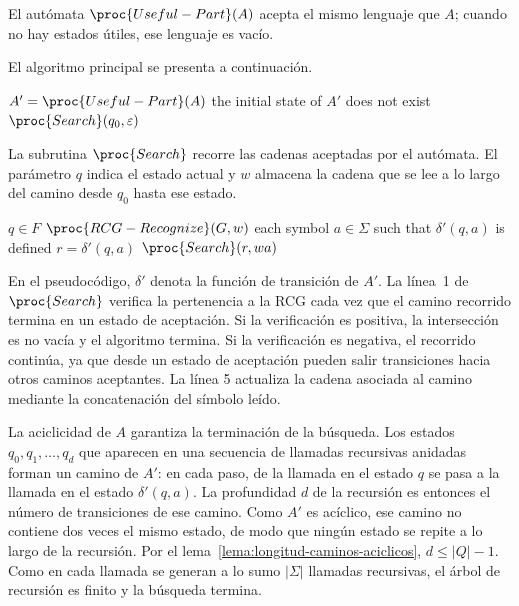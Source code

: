 \documentclass{report}
\theoremstyle{definition}
\theoremstyle{plain}
\theoremstyle{remark}
\begin{document}

El autómata $\proc{Useful-Part}(A)$ acepta el mismo lenguaje que $A$;
cuando no hay estados útiles, ese lenguaje es vacío.

El algoritmo principal se presenta a continuación.

\begin{codebox}
  \li $A' = \proc{Useful-Part}(A)$
  \li \If the initial state of $A'$ does not exist
  \li \Then \Return {}
  \End
  \li \Return $\proc{Search}(q_0,\varepsilon)$
\end{codebox}

La subrutina $\proc{Search}$ recorre las cadenas aceptadas por el
autómata. El parámetro $q$ indica el estado actual y $w$ almacena la
cadena que se lee a lo largo del camino desde $q_0$ hasta ese estado.

\begin{codebox}
  \li \If $q \in F$  $\proc{RCG-Recognize}(G,w)$
  \li \Then \Return {}
  \End
  \li \For each symbol $a \in \Sigma$ such that $\delta'(q,a)$ is defined
  \li \Do
  $r = \delta'(q,a)$
  \li     \If $\proc{Search}(r,wa)$
  \li     \Then \Return {}
  \End
  \End
  \li \Return {}
\end{codebox}

En el pseudocódigo, $\delta'$ denota la función de transición de $A'$.
La línea~1 de $\proc{Search}$ verifica la pertenencia a la RCG cada vez
que el camino recorrido termina en un estado de aceptación. Si la
verificación
es positiva, la intersección es no vacía y el algoritmo termina. Si la
verificación es negativa, el recorrido continúa, ya que desde un estado
de aceptación pueden salir transiciones hacia otros caminos aceptantes.
La línea
5 actualiza la cadena asociada al camino mediante la concatenación del
símbolo leído.

La aciclicidad de $A$ garantiza la terminación de la búsqueda. Los
estados $q_0,q_1,\ldots,q_d$ que aparecen en una secuencia de llamadas
recursivas anidadas forman un camino de $A'$: en cada paso, de la
llamada en el estado $q$ se pasa a la llamada en el estado
$\delta'(q,a)$. La profundidad $d$ de la recursión es entonces el número
de transiciones de ese camino. Como $A'$ es acíclico, ese camino no
contiene dos veces el mismo estado, de modo que ningún estado se repite
a lo largo de la recursión. Por el
lema~\ref{lema:longitud-caminos-aciclicos}, $d \le |Q|-1$. Como en cada
llamada se generan a lo sumo $|\Sigma|$ llamadas recursivas, el árbol de
recursión es finito y la búsqueda termina.
\end{document}
